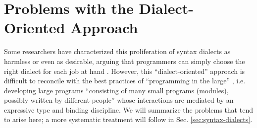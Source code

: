 
\section{Problems with the Dialect-Oriented Approach}\label{sec:problems-with-dialects}
Some researchers have characterized this proliferation of syntax dialects as harmless or even as desirable, arguing that programmers can simply choose the right dialect for each job at hand \cite{journals/stp/Ward94}. However, this ``dialect-oriented'' approach is difficult to reconcile with the best practices of ``programming in the large''  \cite{DeRemer76}, i.e. developing large programs ``consisting of many small programs (modules), possibly written by different people'' whose interactions are mediated by an expressive type and binding discipline. We will summarize the problems that tend to arise here; a more systematic treatment will follow in  Sec. \ref{sec:syntax-dialects}.

